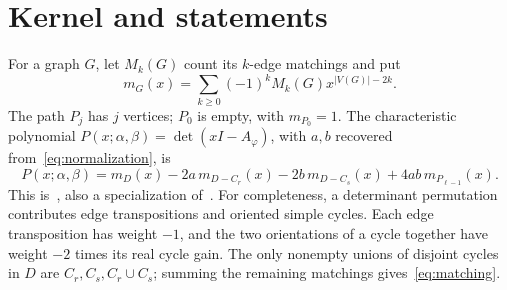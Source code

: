 \documentclass[11pt,a4paper]{article}
\theoremstyle{remark}
\begin{document}
\section{Kernel and statements}

For a graph $G$, let $M_k(G)$ count its $k$-edge matchings and put
\[
 m_G(x)=\sum_{k\geq0}(-1)^k M_k(G)x^{|V(G)|-2k}.
\]
The path $P_j$ has $j$ vertices; $P_0$ is empty, with $m_{P_0}=1$.
The characteristic polynomial $P(x;\alpha,\beta)=\det(xI-A_\varphi)$,
with $a,b$ recovered from~\eqref{eq:normalization}, is
\begin{equation}\label{eq:matching}
 P(x;\alpha,\beta)
 =m_D(x)-2a\,m_{D-C_r}(x)-2b\,m_{D-C_s}(x)
       +4ab\,m_{P_{\ell-1}}(x).
\end{equation}
This is~\cite[Theorem 2.10]{HuangPereyra2026}, also a specialization
of~\cite[Theorem 4.3]{SamantaKannan2025}. For completeness, a determinant
permutation contributes edge transpositions and oriented simple cycles.
Each edge transposition has weight $-1$, and the two orientations of
a cycle together have weight $-2$ times its real cycle gain. The only
nonempty unions of disjoint cycles in $D$ are $C_r,C_s,C_r\cup C_s$;
summing the remaining matchings gives~\eqref{eq:matching}.
\end{document}
